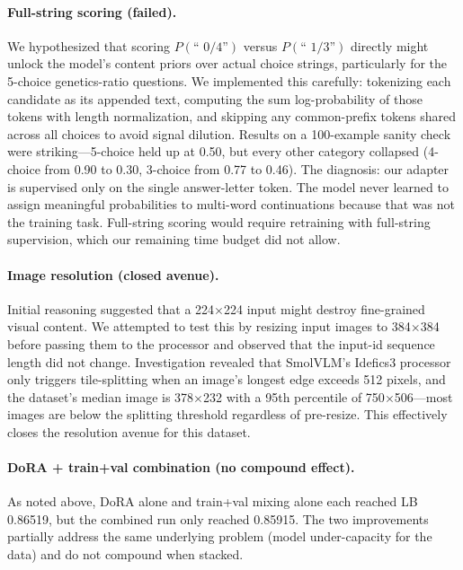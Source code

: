 \documentclass[11pt]{article}
\begin{document}
\paragraph{Full-string scoring (failed).} We hypothesized that scoring \(P(\text{`` 0/4''})\) versus \(P(\text{`` 1/3''})\) directly might unlock the model's content priors over actual choice strings, particularly for the 5-choice genetics-ratio questions. We implemented this carefully: tokenizing each candidate as its appended text, computing the sum log-probability of those tokens with length normalization, and skipping any common-prefix tokens shared across all choices to avoid signal dilution. Results on a 100-example sanity check were striking---5-choice held up at 0.50, but every other category collapsed (4-choice from 0.90 to 0.30, 3-choice from 0.77 to 0.46). The diagnosis: our adapter is supervised only on the single answer-letter token. The model never learned to assign meaningful probabilities to multi-word continuations because that was not the training task. Full-string scoring would require retraining with full-string supervision, which our remaining time budget did not allow.

\paragraph{Image resolution (closed avenue).} Initial reasoning suggested that a 224$\times$224 input might destroy fine-grained visual content. We attempted to test this by resizing input images to 384$\times$384 before passing them to the processor and observed that the input-id sequence length did not change. Investigation revealed that SmolVLM's Idefics3 processor only triggers tile-splitting when an image's longest edge exceeds 512 pixels, and the dataset's median image is 378$\times$232 with a 95th percentile of 750$\times$506---most images are below the splitting threshold regardless of pre-resize. This effectively closes the resolution avenue for this dataset.

\paragraph{DoRA + train+val combination (no compound effect).} As noted above, DoRA alone and train+val mixing alone each reached LB 0.86519, but the combined run only reached 0.85915. The two improvements partially address the same underlying problem (model under-capacity for the data) and do not compound when stacked.
\end{document}
